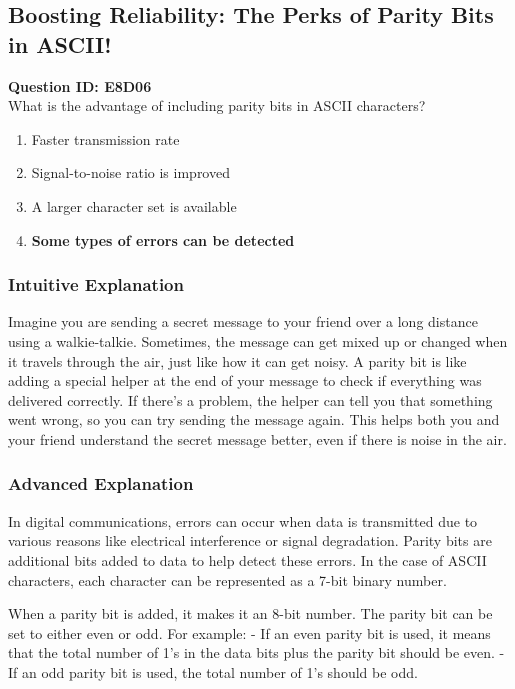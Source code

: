 \subsection{Boosting Reliability: The Perks of Parity Bits in ASCII!}

\begin{tcolorbox}[colback=blue!5!white, colframe=blue!75!black, title=E8D06]
    \textbf{Question ID: E8D06} \\
    What is the advantage of including parity bits in ASCII characters? \\
    \begin{enumerate}[label=\Alph*.]
        \item Faster transmission rate
        \item Signal-to-noise ratio is improved
        \item A larger character set is available
        \item \textbf{Some types of errors can be detected}
    \end{enumerate}
\end{tcolorbox}

\subsubsection{Intuitive Explanation}
Imagine you are sending a secret message to your friend over a long distance using a walkie-talkie. Sometimes, the message can get mixed up or changed when it travels through the air, just like how it can get noisy. A parity bit is like adding a special helper at the end of your message to check if everything was delivered correctly. If there’s a problem, the helper can tell you that something went wrong, so you can try sending the message again. This helps both you and your friend understand the secret message better, even if there is noise in the air.

\subsubsection{Advanced Explanation}
In digital communications, errors can occur when data is transmitted due to various reasons like electrical interference or signal degradation. Parity bits are additional bits added to data to help detect these errors. In the case of ASCII characters, each character can be represented as a 7-bit binary number. 

When a parity bit is added, it makes it an 8-bit number. The parity bit can be set to either even or odd. For example:
- If an even parity bit is used, it means that the total number of 1's in the data bits plus the parity bit should be even.
- If an odd parity bit is used, the total number of 1's should be odd.

